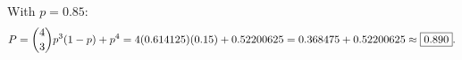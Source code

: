With $p=0.85$:
\[P=\dbinom43p^3(1-p)+p^4=4(0.614125)(0.15)+0.52200625=0.368475+0.52200625\approx\boxed{0.890}.\]
